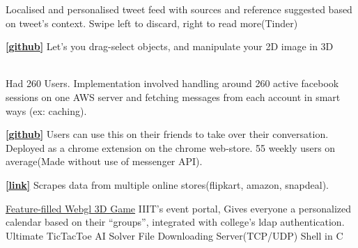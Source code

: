 \documentclass[]{deedy-resume-openfont}
\begin{document}
\begin{minipage}[t]{0.66\textwidth}
Localised and personalised tweet feed with sources and reference suggested based on tweet’s context. Swipe left to discard, right to read more(Tinder)
\sectionsep

\textbf{\href{https://github.com/mukulhase/3-Sweep-Library}{[\underline{github}]}} Let's you drag-select objects, and manipulate your 2D image in 3D
\sectionsep

 \\
Had 260 Users. Implementation involved handling around 260 active facebook sessions on one AWS server and fetching messages from each account in smart ways (ex: caching).
\sectionsep


\textbf{\href{https://github.com/NMBL/CleverFB}{[\underline{github}]}} Users can use this on their friends to take over their conversation. Deployed as a chrome extension on the chrome web-store. 55 weekly users on average(Made without use of messenger API).
\sectionsep 


\textbf{\href{http://mukulhase.com/Comparison/project/Project_Files/index.html}{[link]}} Scrapes data from multiple online stores(flipkart, amazon, snapdeal).
\sectionsep






 \textbullet
\href{https://mukulhase.com/ThreeJSCarrom/}{\underline{Feature-filled Webgl 3D Game}} \textbullet  IIIT’s event portal, Gives everyone a personalized calendar based on their “groups”, integrated with college’s ldap authentication. \textbullet Ultimate\textbf{} TicTacToe AI Solver \textbullet File Downloading Server(TCP/UDP) \textbullet Shell in C

\sectionsep


\end{minipage} 
\end{document}
